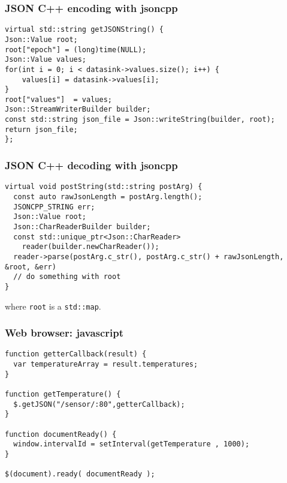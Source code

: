 \documentclass[xcolor=dvipsnames]{beamer}
\begin{document}
\begin{frame}[fragile]
  \frametitle{JSON C++ encoding with jsoncpp}
\begin{verbatim}
virtual std::string getJSONString() {
Json::Value root;
root["epoch"] = (long)time(NULL);
Json::Value values;
for(int i = 0; i < datasink->values.size(); i++) {
    values[i] = datasink->values[i];
}
root["values"]  = values;
Json::StreamWriterBuilder builder;
const std::string json_file = Json::writeString(builder, root);
return json_file;
};
\end{verbatim}
\end{frame}


\begin{frame}[fragile]
  \frametitle{JSON C++ decoding with jsoncpp}
  \begin{verbatim}
virtual void postString(std::string postArg) {
  const auto rawJsonLength = postArg.length();
  JSONCPP_STRING err;
  Json::Value root;
  Json::CharReaderBuilder builder;
  const std::unique_ptr<Json::CharReader>
    reader(builder.newCharReader());
  reader->parse(postArg.c_str(), postArg.c_str() + rawJsonLength, &root, &err)
  // do something with root
}
\end{verbatim}
  where \texttt{root} is a \texttt{std::map}.
\end{frame}


\begin{frame}[fragile]
  \frametitle{Web browser: javascript}

  \begin{verbatim}
function getterCallback(result) {
  var temperatureArray = result.temperatures;
}

function getTemperature() {
  $.getJSON("/sensor/:80",getterCallback);
}

function documentReady() {
  window.intervalId = setInterval(getTemperature , 1000);
}

$(document).ready( documentReady );
\end{verbatim}
\end{frame}
\end{document}
